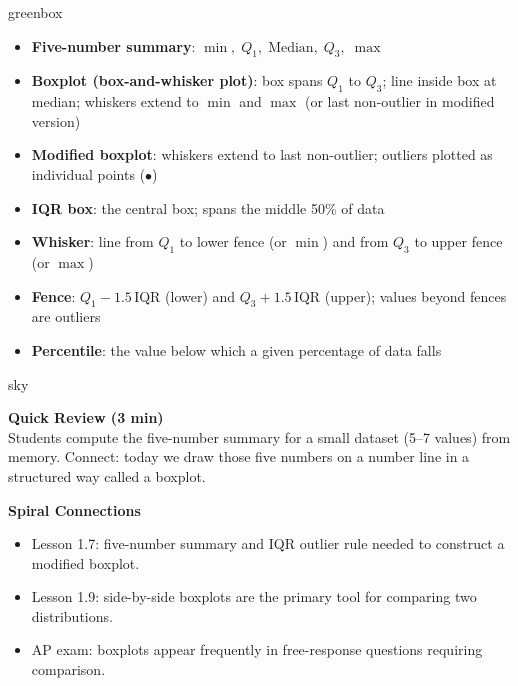 \documentclass[10pt]{article}
\begin{document}
\boxguard
\begin{skillbox}{greenbox}
\begin{minipage}[t]{0.48\linewidth}
    \begin{itemize}
        \item \textbf{Five-number summary}: $\min,\; Q_1,\; \text{Median},\; Q_3,\; \max$
        \item \textbf{Boxplot (box-and-whisker plot)}: box spans $Q_1$ to $Q_3$; line inside box at median; whiskers extend to $\min$ and $\max$ (or last non-outlier in modified version)
        \item \textbf{Modified boxplot}: whiskers extend to last non-outlier; outliers plotted as individual points ($\bullet$)
    \end{itemize}
\end{minipage}
\hfill
\begin{minipage}[t]{0.48\linewidth}
    \begin{itemize}
        \item \textbf{IQR box}: the central box; spans the middle 50\% of data
        \item \textbf{Whisker}: line from $Q_1$ to lower fence (or $\min$) and from $Q_3$ to upper fence (or $\max$)
        \item \textbf{Fence}: $Q_1 - 1.5\,\text{IQR}$ (lower) and $Q_3 + 1.5\,\text{IQR}$ (upper); values beyond fences are outliers
        \item \textbf{Percentile}: the value below which a given percentage of data falls
    \end{itemize}
\end{minipage}
\end{skillbox}

\boxguard
\begin{skillbox}{sky}
\begin{minipage}[t]{0.48\linewidth}
    \textbf{Quick Review (3 min)}\\
    Students compute the five-number summary for a small dataset (5--7 values) from memory. Connect: today we draw those five numbers on a number line in a structured way called a boxplot.
\end{minipage}
\hfill
\begin{minipage}[t]{0.48\linewidth}
    \textbf{Spiral Connections}
    \begin{itemize}
        \item Lesson 1.7: five-number summary and IQR outlier rule needed to construct a modified boxplot.
        \item Lesson 1.9: side-by-side boxplots are the primary tool for comparing two distributions.
        \item AP exam: boxplots appear frequently in free-response questions requiring comparison.
    \end{itemize}
\end{minipage}
\end{skillbox}
\end{document}
